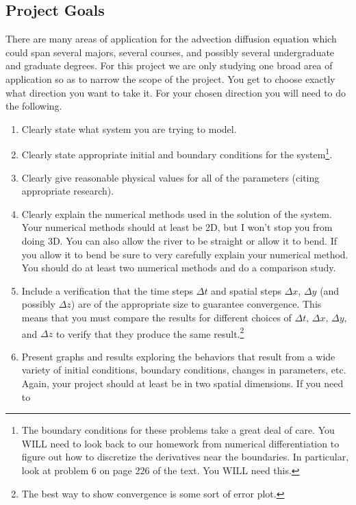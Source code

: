 \subsection*{Project Goals}
There are many areas of application for the advection diffusion equation which could span
several majors, several courses, and possibly several undergraduate and graduate degrees.
For this project we are only studying one broad area of application
so as to narrow the scope of the project. You get to choose exactly what direction
you want to take it.  For your chosen direction you will need to do the following.
\begin{enumerate}
    \item Clearly state what system you are trying to model.
    \item Clearly state appropriate initial and boundary conditions for the
        system\footnote{The boundary conditions for these problems take a great deal of
        care.  You WILL need to look back to our homework from numerical differentiation
    to figure out how to discretize the derivatives near the boundaries. In particular,
look at problem 6 on page 226 of the text.  You WILL need this.}.
    \item Clearly give reasonable physical values for all of the parameters (citing
        appropriate research).
    \item Clearly explain the numerical methods used in the solution of the system.  Your
        numerical methods should at least be 2D, but I won't stop you from doing 3D.  You
        can also allow the river to be straight or allow it to bend.  If you allow it to
        bend be sure to very carefully explain your numerical method.  You should do
        at least two numerical methods and do a comparison study.
    \item Include a verification that the time steps $\Delta t$ and spatial steps $\Delta
        x$, $\Delta y$ (and possibly $\Delta z$) are of the appropriate size to guarantee
        convergence.  This means that you must compare the results for different choices
        of $\Delta t, \, \Delta x, \, \Delta y,$ and $\Delta z$ to verify that they
        produce the same result.\footnote{The best way to show convergence is some sort of error
        plot.}  
    \item Present graphs and results exploring the behaviors that result from a wide
        variety of initial conditions, boundary conditions, changes in parameters, etc.
        Again, your project should at least be in two spatial dimensions.  If you need to

\end{enumerate}

